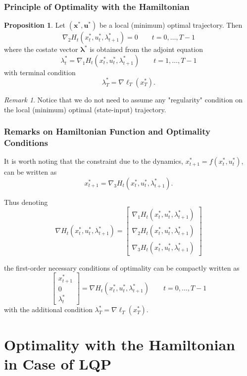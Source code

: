 \documentclass[openany]{book}
\theoremstyle{definition}
\newtheorem{proposition}{Proposition}[section]
\theoremstyle{remark}
\newtheorem*{remark}{Remark}
\begin{document}
\subsubsection{Principle of Optimality with the Hamiltonian}

\begin{proposition}
Let $(\mathbf{x}^*, \mathbf{u}^*)$ be a local (minimum) optimal trajectory. Then
\[
\nabla_2 H_t(x_t^*, u_t^*, \lambda_{t+1}^*) = 0 \qquad t = 0,\ldots,T-1
\]
where the costate vector $\boldsymbol{\lambda}^*$ is obtained from the adjoint equation
\[
\lambda_t^* = \nabla_1 H_t(x_t^*, u_t^*, \lambda_{t+1}^*) \qquad t = 1,\ldots,T-1
\]
with terminal condition
\[
\lambda_T^* = \nabla\ell_T(x_T^*).
\]
\end{proposition}

\begin{remark}
Notice that we do not need to assume any "regularity" condition on the local (minimum) optimal (state-input) trajectory.
\end{remark}

\subsubsection{Remarks on Hamiltonian Function and Optimality Conditions}

It is worth noting that the constraint due to the dynamics, $x_{t+1}^* = f(x_t^*, u_t^*)$, can be written as
\[
x_{t+1}^* = \nabla_3 H_t(x_t^*, u_t^*, \lambda_{t+1}^*).
\]

Thus denoting
\[
\nabla H_t(x_t^*, u_t^*, \lambda_{t+1}^*) = \begin{bmatrix}
\nabla_1 H_t(x_t^*, u_t^*, \lambda_{t+1}^*) \\
\nabla_2 H_t(x_t^*, u_t^*, \lambda_{t+1}^*) \\
\nabla_3 H_t(x_t^*, u_t^*, \lambda_{t+1}^*)
\end{bmatrix}
\]

the first-order necessary conditions of optimality can be compactly written as
\[
\begin{bmatrix}
x_{t+1}^* \\ 0 \\ \lambda_t^*
\end{bmatrix} = \nabla H_t(x_t^*, u_t^*, \lambda_{t+1}^*) \qquad t = 0,\ldots,T-1
\]
with the additional condition $\lambda_T^* = \nabla\ell_T(x_T^*)$.

\section{Optimality with the Hamiltonian in Case of LQP}
\end{document}
